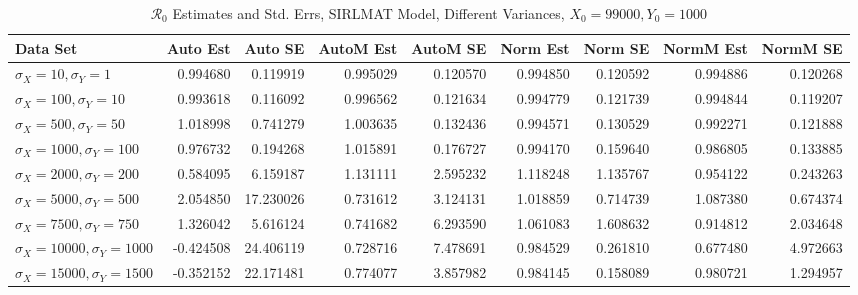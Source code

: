 \documentclass[12pt]{article}
\newcommand{\rr}{\ensuremath{\mathcal{R}_0}}
\begin{document}
\begin{table}[H]
	
	\caption{$\rr$ Estimates and Std. Errs, SIRLMAT Model,
		Different Variances, 
		$X_0 = 99000, Y_0 = 1000$}
	\begin{footnotesize}
		\hskip -1.7cm
		\begin{tabular}{l|r|r|r|r|r|r|r|r}
			\hline
			Data Set & Auto Est & Auto SE & AutoM Est & AutoM SE & Norm Est & Norm SE & NormM Est & NormM SE\\
			\hline
			$\sigma_X = 10, \sigma_Y = 1$ & 0.994680 & 0.119919 & 0.995029 & 0.120570 & 0.994850 & 0.120592 & 0.994886 & 0.120268\\
			\hline
			$\sigma_X = 100, \sigma_Y = 10$ & 0.993618 & 0.116092 & 0.996562 & 0.121634 & 0.994779 & 0.121739 & 0.994844 & 0.119207\\
			\hline
			$\sigma_X = 500, \sigma_Y = 50$ & 1.018998 & 0.741279 & 1.003635 & 0.132436 & 0.994571 & 0.130529 & 0.992271 & 0.121888\\
			\hline
			$\sigma_X = 1000, \sigma_Y = 100$ & 0.976732 & 0.194268 & 1.015891 & 0.176727 & 0.994170 & 0.159640 & 0.986805 & 0.133885\\
			\hline
			$\sigma_X = 2000, \sigma_Y = 200$ & 0.584095 & 6.159187 & 1.131111 & 2.595232 & 1.118248 & 1.135767 & 0.954122 & 0.243263\\
			\hline
			$\sigma_X = 5000, \sigma_Y = 500$ & 2.054850 & 17.230026 & 0.731612 & 3.124131 & 1.018859 & 0.714739 & 1.087380 & 0.674374\\
			\hline
			$\sigma_X = 7500, \sigma_Y = 750$ & 1.326042 & 5.616124 & 0.741682 & 6.293590 & 1.061083 & 1.608632 & 0.914812 & 2.034648\\
			\hline
			$\sigma_X = 10000, \sigma_Y = 1000$ & -0.424508 & 24.406119 & 0.728716 & 7.478691 & 0.984529 & 0.261810 & 0.677480 & 4.972663\\
			\hline
			$\sigma_X = 15000, \sigma_Y = 1500$ & -0.352152 & 22.171481 & 0.774077 & 3.857982 & 0.984145 & 0.158089 & 0.980721 & 1.294957\\
			\hline
		\end{tabular}
	\end{footnotesize}
\end{table}
\end{document}
